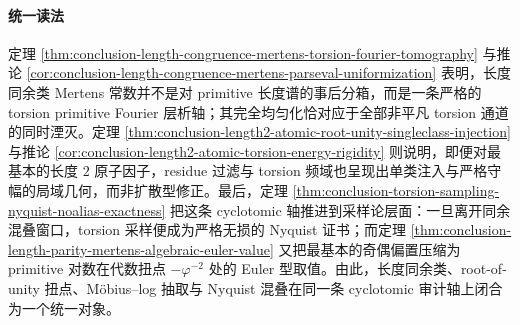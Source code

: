 \paragraph{统一读法}
定理 \ref{thm:conclusion-length-congruence-mertens-torsion-fourier-tomography} 与推论 \ref{cor:conclusion-length-congruence-mertens-parseval-uniformization} 表明，长度同余类 Mertens 常数并不是对 primitive 长度谱的事后分箱，而是一条严格的 torsion primitive Fourier 层析轴；其完全均匀化恰对应于全部非平凡 torsion 通道的同时湮灭。定理 \ref{thm:conclusion-length2-atomic-root-unity-singleclass-injection} 与推论 \ref{cor:conclusion-length2-atomic-torsion-energy-rigidity} 则说明，即便对最基本的长度 \(2\) 原子因子，residue 过滤与 torsion 频域也呈现出单类注入与严格守幅的局域几何，而非扩散型修正。最后，定理 \ref{thm:conclusion-torsion-sampling-nyquist-noalias-exactness} 把这条 cyclotomic 轴推进到采样论层面：一旦离开同余混叠窗口，torsion 采样便成为严格无损的 Nyquist 证书；而定理 \ref{thm:conclusion-length-parity-mertens-algebraic-euler-value} 又把最基本的奇偶偏置压缩为 primitive 对数在代数扭点 \(-\varphi^{-2}\) 处的 Euler 型取值。由此，长度同余类、root-of-unity 扭点、Möbius--log 抽取与 Nyquist 混叠在同一条 cyclotomic 审计轴上闭合为一个统一对象。

\endinput
